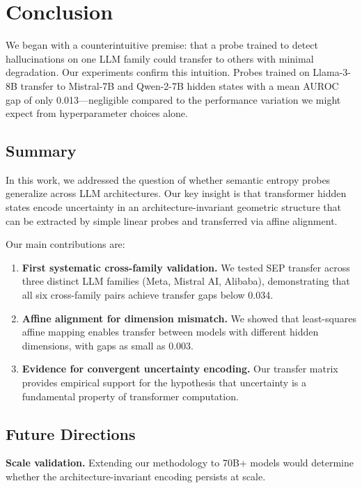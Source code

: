 \section{Conclusion}

We began with a counterintuitive premise: that a probe trained to detect hallucinations on one LLM family could transfer to others with minimal degradation. Our experiments confirm this intuition. Probes trained on Llama-3-8B transfer to Mistral-7B and Qwen-2-7B hidden states with a mean AUROC gap of only 0.013---negligible compared to the performance variation we might expect from hyperparameter choices alone.

\subsection{Summary}

In this work, we addressed the question of whether semantic entropy probes generalize across LLM architectures. Our key insight is that transformer hidden states encode uncertainty in an architecture-invariant geometric structure that can be extracted by simple linear probes and transferred via affine alignment.

Our main contributions are:

\begin{enumerate}
\item \textbf{First systematic cross-family validation.} We tested SEP transfer across three distinct LLM families (Meta, Mistral AI, Alibaba), demonstrating that all six cross-family pairs achieve transfer gaps below 0.034.

\item \textbf{Affine alignment for dimension mismatch.} We showed that least-squares affine mapping enables transfer between models with different hidden dimensions, with gaps as small as 0.003.

\item \textbf{Evidence for convergent uncertainty encoding.} Our transfer matrix provides empirical support for the hypothesis that uncertainty is a fundamental property of transformer computation.
\end{enumerate}

\subsection{Future Directions}

\textbf{Scale validation.} Extending our methodology to 70B+ models would determine whether the architecture-invariant encoding persists at scale.

